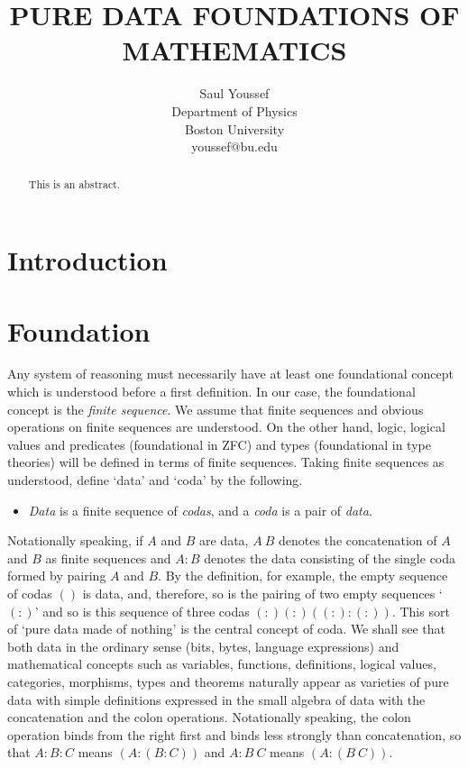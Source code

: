 \documentclass[11pt]{article}
\begin{document}
\title{\bf {PURE DATA FOUNDATIONS OF MATHEMATICS}}
\author{%
  Saul Youssef%
  \hfil \\
  Department of Physics \\
  Boston University \\
  youssef@bu.edu\\
}
\maketitle
\begin{abstract}
This is an abstract.
\end{abstract}

\section{Introduction}

\section{Foundation}

     Any system of reasoning must necessarily have at least one foundational concept which is understood before a first definition.  In our case, the foundational concept is the {\it finite sequence}.  We assume that finite sequences and obvious operations on finite sequences are understood.  On the other hand, logic, logical values and predicates (foundational in ZFC) and types (foundational in type theories) will be defined in terms of finite sequences.
Taking finite sequences as understood, define `data' and `coda' by the following.
\begin{itemize}
\item {\it Data} is a finite sequence of {\it codas}, and a {\it coda} is a pair of {\it data}. 
\end{itemize}
Notationally speaking, if $A$ and $B$ are data, $A\ B$ denotes the concatenation of $A$ and $B$ as finite sequences and $A:B$ denotes the data
consisting of the single coda formed by pairing $A$ and $B$.  By the definition, for example, the empty sequence of codas $()$ is data, and, therefore,
so is the pairing of two empty sequences `$(:)$' and so is this sequence of three codas $(:) (:) ((:):(:))$.  This sort of `pure data made of nothing' is
the central concept of coda.
We shall see that both data in the ordinary sense (bits, bytes, language expressions) and mathematical concepts such as variables, functions, definitions, logical values, categories, morphisms, types and theorems naturally appear as varieties of pure data with simple definitions expressed in the small algebra
of data with the concatenation and
the colon operations.   Notationally speaking, the colon operation binds from the right first and binds less strongly than concatenation, so that
 $A:B:C$ means $(A:(B:C))$ and $A:B\ C$ means $(A:(B\ C))$.
\end{document}
